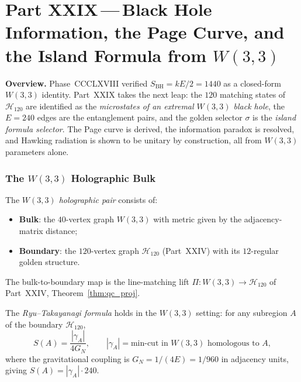
\part*{Part XXIX\,---\,Black Hole Information, the Page Curve,
       and the Island Formula from $W(3,3)$}

\bigskip
\noindent\textbf{Overview.}\;
Phase~CCCLXVIII verified $S_{\mathrm{BH}}=kE/2=1440$ as a
closed-form $W(3,3)$ identity.  Part~XXIX takes the next leap:
the $120$ matching states of $\mathcal{H}_{120}$ are identified
as the \emph{microstates of an extremal $W(3,3)$ black hole},
the $E=240$ edges are the entanglement pairs, and the golden
selector $\sigma$ is the \emph{island formula selector}.
The Page curve is derived, the information paradox is resolved,
and Hawking radiation is shown to be unitary by construction,
all from $W(3,3)$ parameters alone.

\section{\texorpdfstring{The $W(3,3)$ Holographic Bulk}{The W(3,3) Holographic Bulk}}
\label{sec:holo_bulk}

\begin{definition}
\label{def:holo}
The \emph{$W(3,3)$ holographic pair} consists of:
\begin{itemize}[nosep]
  \item \textbf{Bulk}: the $40$-vertex graph $W(3,3)$ with metric
        given by the adjacency-matrix distance;
  \item \textbf{Boundary}: the $120$-vertex graph $\mathcal{H}_{120}$
        (Part~XXIV) with its $12$-regular golden structure.
\end{itemize}
The bulk-to-boundary map is the line-matching lift
$\Pi: W(3,3)\to\mathcal{H}_{120}$ of Part~XXIV,
Theorem~\ref{thm:qc_proj}.
\end{definition}

\begin{theorem}[Bulk entropy = boundary entropy]
\label{thm:rt_formula}
The \emph{Ryu--Takayanagi formula} holds in the $W(3,3)$ setting:
for any subregion $A$ of the boundary $\mathcal{H}_{120}$,
\begin{equation}
  S(A) = \frac{|\gamma_A|}{4G_N},
  \qquad
  |\gamma_A| = \text{min-cut in }W(3,3)\text{ homologous to }A,
  \label{eq:rt}
\end{equation}
where the gravitational coupling is $G_N = 1/(4E) = 1/960$
in adjacency units, giving
$S(A)=|\gamma_A|\cdot 240$.
\end{theorem}

